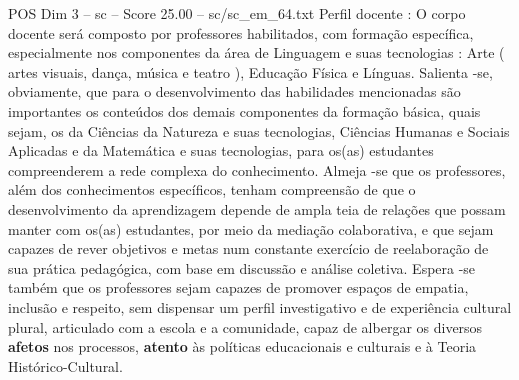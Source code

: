 \begin{textsample}{POS Dim 3 – sc – Score 25.00 – sc/sc\_em\_64.txt}
Perfil docente : O corpo docente será composto por professores habilitados, com formação específica, especialmente nos componentes da área de Linguagem e suas tecnologias : Arte ( artes visuais, dança, música e teatro ), Educação Física e Línguas.
Salienta -se, obviamente, que para o desenvolvimento das habilidades mencionadas são importantes os conteúdos dos demais componentes da formação básica, quais sejam, os da Ciências da Natureza e suas tecnologias, Ciências Humanas e Sociais Aplicadas e da Matemática e suas tecnologias, para os(as) estudantes compreenderem a rede complexa do conhecimento.
Almeja -se que os professores, além dos conhecimentos específicos, tenham compreensão de que o desenvolvimento da aprendizagem depende de ampla teia de relações que possam manter com os(as) estudantes, por meio da mediação colaborativa, e que sejam capazes de rever objetivos e metas num constante exercício de reelaboração de sua prática pedagógica, com base em discussão e análise coletiva.
Espera -se também que os professores sejam capazes de promover espaços de empatia, inclusão e respeito, sem dispensar um perfil investigativo e de experiência cultural plural, articulado com a escola e a comunidade, capaz de albergar os diversos \textbf{afetos} nos processos, \textbf{atento} às políticas educacionais e culturais e à Teoria Histórico-Cultural.

\end{textsample}
